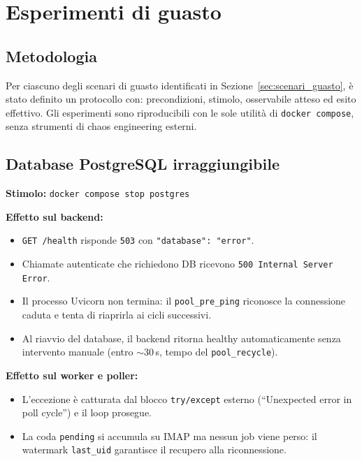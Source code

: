 \chapter{Esperimenti di guasto}
\label{chap:failure}

\section{Metodologia}
\label{sec:metodologia_failure}

Per ciascuno degli scenari di guasto identificati in Sezione~\ref{sec:scenari_guasto},
\`e stato definito un protocollo con: precondizioni, stimolo, osservabile atteso ed
esito effettivo. Gli esperimenti sono riproducibili con le sole utilit\`a di
\texttt{docker compose}, senza strumenti di chaos engineering esterni.

\section{Database PostgreSQL irraggiungibile}
\label{sec:fail_db}

\textbf{Stimolo:} \texttt{docker compose stop postgres}

\textbf{Effetto sul backend:}
\begin{itemize}[leftmargin=*]
    \item \texttt{GET /health} risponde \texttt{503} con \texttt{"database": "error"}.
    \item Chiamate autenticate che richiedono DB ricevono \texttt{500 Internal Server Error}.
    \item Il processo Uvicorn non termina: il \texttt{pool\_pre\_ping} riconosce la
          connessione caduta e tenta di riaprirla ai cicli successivi.
    \item Al riavvio del database, il backend ritorna healthy automaticamente senza
          intervento manuale (entro $\sim 30$\,s, tempo del \texttt{pool\_recycle}).
\end{itemize}

\textbf{Effetto sul worker e poller:}
\begin{itemize}[leftmargin=*]
    \item L'eccezione \`e catturata dal blocco \texttt{try/except} esterno
          (``Unexpected error in poll cycle'') e il loop prosegue.
    \item La coda \texttt{pending} si accumula su IMAP ma nessun job viene perso:
          il watermark \texttt{last\_uid} garantisce il recupero alla riconnessione.
\end{itemize}

